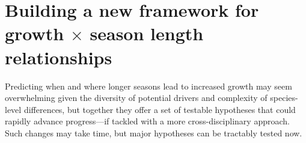 

\section*{Building a new framework for growth $\times$ season length relationships} 
Predicting when and where longer seasons lead to increased growth may seem overwhelming given the diversity of potential drivers and complexity of species-level differences, but together they offer a set of testable hypotheses that could rapidly advance progress---if tackled with a more cross-disciplinary approach. Such changes may take time, but major hypotheses can be tractably tested now. 

